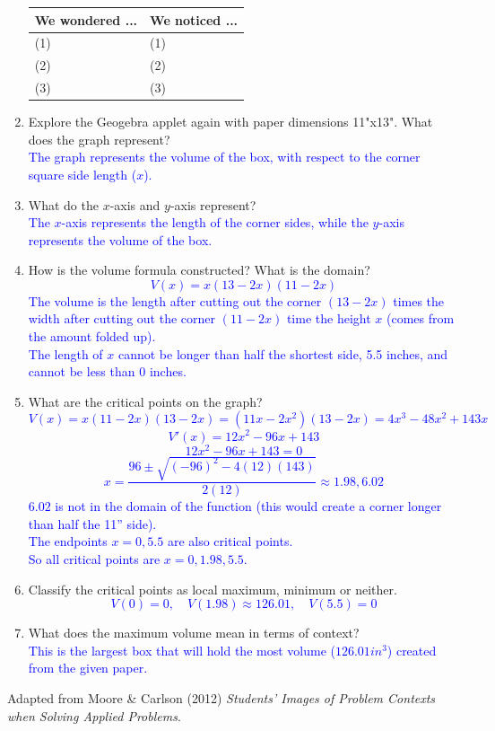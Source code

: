 \documentclass{ximera}
\begin{document}
\begin{exercise}
\begin{enumerate}
        \begin{tabular}{l|l}
            We wondered ... & We noticed ...\\ \hline
            (1) & (1)\\
            (2) & (2)\\
            (3) & (3)\\
        \end{tabular}
        \item Explore the Geogebra applet again with paper dimensions 11"x13".  What does the graph represent?\\
        \textcolor{blue}{The graph represents the volume of the box, with respect to the corner square side length ($x$).}
        \item What do the $x$-axis and $y$-axis represent? \\
        \textcolor{blue}{The $x$-axis represents the length of the corner sides, while the $y$-axis represents the volume of the box.}
        \item How is the volume formula constructed?  What is the domain?\\
        \textcolor{blue}{\[V(x)=x(13-2x)(11-2x)\]
        The volume is the length after cutting out the corner $(13-2x)$ times the width after cutting out the corner $(11-2x)$ time the height $x$ (comes from the amount folded up).\\
        The length of $x$ cannot be longer than half the shortest side, 5.5 inches, and cannot be less than 0 inches.}
        \item What are the critical points on the graph?\\
        \textcolor{blue}{
            \[V(x)=x(11-2x)(13-2x)=(11x-2x^2)(13-2x)=4x^3-48x^2+143x\]
            \[V'(x)=12x^2-96x+143\]
            \[12x^2-96x+143=0\]
            \[x=\frac{96\pm\sqrt{(-96)^2-4(12)(143)}}{2(12)}\approx 1.98,6.02\]
            $6.02$ is not in the domain of the function (this would create a corner longer than half the 11'' side). \\
            The endpoints $x=0,5.5$ are also critical points.\\
            So all critical points are $x=0,1.98,5.5$.
        }
        \item Classify the critical points as local maximum, minimum or neither.\\
        \textcolor{blue}{
  \[
    V(0)=0,\quad
    V(1.98)\approx 126.01,\quad
    V(5.5)=0
  \]
}
        \item What does the maximum volume mean in terms of context?\\
        \textcolor{blue}{This is the largest box that will hold the most volume ($126.01in^3$) created from the given paper.}
    \end{enumerate}
    Adapted from Moore \& Carlson (2012) \textit{Students' Images of Problem Contexts when Solving Applied Problems}.
\end{exercise}
\end{document}

